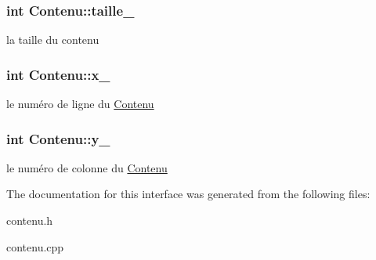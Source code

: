 \subsubsection[{\texorpdfstring{taille\+\_\+}{taille_}}]{\setlength{\rightskip}{0pt plus 5cm}int Contenu\+::taille\+\_\+\hspace{0.3cm}{\ttfamily [protected]}}\hypertarget{class_contenu_a354281d1fa2b2e8e39ee84c56115a7f5}{}\label{class_contenu_a354281d1fa2b2e8e39ee84c56115a7f5}
la taille du contenu 
\subsubsection[{\texorpdfstring{x\+\_\+}{x_}}]{\setlength{\rightskip}{0pt plus 5cm}int Contenu\+::x\+\_\+\hspace{0.3cm}{\ttfamily [protected]}}\hypertarget{class_contenu_a181b4b730433d5f2775d0c19cadd4132}{}\label{class_contenu_a181b4b730433d5f2775d0c19cadd4132}
le numéro de ligne du \hyperlink{class_contenu}{Contenu} 
\subsubsection[{\texorpdfstring{y\+\_\+}{y_}}]{\setlength{\rightskip}{0pt plus 5cm}int Contenu\+::y\+\_\+\hspace{0.3cm}{\ttfamily [protected]}}\hypertarget{class_contenu_a571f1aa960aaaa1971bfefe70326457d}{}\label{class_contenu_a571f1aa960aaaa1971bfefe70326457d}
le numéro de colonne du \hyperlink{class_contenu}{Contenu} 

The documentation for this interface was generated from the following files\+:\begin{DoxyCompactItemize}
\item 
contenu.\+h\item 
contenu.\+cpp\end{DoxyCompactItemize}
